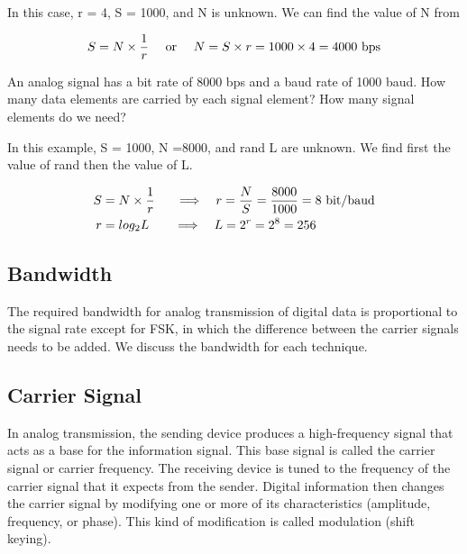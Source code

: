 \begin{solution}
  In this case, r = 4, S = 1000, and N is unknown. We can find the value of N from

  \begin{equation*}
    S = N \times \frac{1}{r} \quad \textnormal{ or } \quad N = S \times r = 1000 \times 4 = 4000 \textnormal{ bps}
  \end{equation*}
\end{solution}

\vspace{12pt}

\begin{example}
  An analog signal has a bit rate of 8000 bps and a baud rate of 1000 baud. How many data elements are carried by each signal element? How many signal elements do we need?
  \label{example5:2}
\end{example}

\begin{solution}
  In this example, S = 1000, N =8000, and rand L are unknown. We find first the value of rand then the value of L.

  \begin{align*}
    S &= N \times \frac{1}{r} \quad \textnormal{ } \textnormal{ } \Longrightarrow \quad r = \frac{N}{S} = \frac{8000}{1000} = 8 \textnormal{ bit/baud} \\
    r &= log_2L \quad \quad \Longrightarrow \quad L = 2^r = 2^8 = 256
  \end{align*}
\end{solution}

\subsection*{Bandwidth}
The required bandwidth for analog transmission of digital data is proportional to the signal rate except for FSK, in which the difference between the carrier signals needs to be added. We discuss the bandwidth for each technique.

\subsection*{Carrier Signal}
In analog transmission, the sending device produces a high-frequency signal that acts as a base for the information signal. This base signal is called the carrier signal or carrier frequency. The receiving device is tuned to the frequency of the carrier signal that it expects from the sender. Digital information then changes the carrier signal by modifying one or more of its characteristics (amplitude, frequency, or phase). This kind of modification is called modulation (shift keying).

